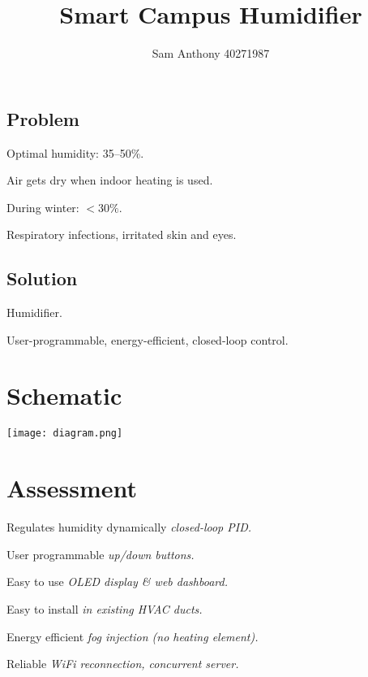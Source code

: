 \documentclass[a5paper, landscape]{article}
\title{Smart Campus Humidifier}
\author{Sam Anthony 40271987}
\date{}
\begin{document}
\maketitle

\newpage

\subsection*{Problem}

Optimal humidity: 35--50\%.

Air gets dry when indoor heating is used.

During winter: $<30\%$.

Respiratory infections, irritated skin and eyes.

\subsection*{Solution}

Humidifier.

User-programmable, energy-efficient, closed-loop control.


\newpage
\section*{Schematic}
\begin{center}
	\texttt{[image: diagram.png]}
\end{center}

\newpage
\section*{Assessment}

\checkmark\quad Regulates humidity dynamically \quad \emph{closed-loop PID.}

\checkmark\quad User programmable \quad \emph{up/down buttons.}

\checkmark\quad Easy to use \quad \emph{OLED display \& web dashboard.}

\checkmark\quad Easy to install \quad \emph{in existing HVAC ducts.}

\checkmark\quad Energy efficient \quad \emph{fog injection (no heating element).}

\checkmark\quad Reliable \quad \emph{WiFi reconnection, concurrent server.}
\end{document}
